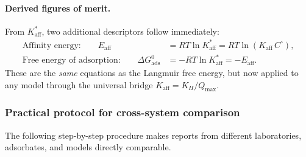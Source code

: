 \documentclass[12pt]{article}
\begin{document}
	\paragraph{Derived figures of merit.}
	From $K_{\mathrm{aff}}^{\ast}$, two additional descriptors follow
	immediately:
	\begin{align}
		\text{Affinity energy:}\qquad
		E_{\mathrm{aff}}
		&= RT\ln K_{\mathrm{aff}}^{\ast}
		= RT\ln(K_{\mathrm{aff}}\, C^\circ),
		\label{eq:Eaff_universal}
		\\[4pt]
		\text{Free energy of adsorption:}\qquad
		\Delta G_{\mathrm{ads}}^{0}
		&= -RT\ln K_{\mathrm{aff}}^{\ast}
		= -E_{\mathrm{aff}}.
		\label{eq:DG_universal}
	\end{align}
	These are the \emph{same} equations as the Langmuir free energy, but
	now applied to any model through the universal bridge
	$K_{\mathrm{aff}} = K_H / Q_{\max}$.

	\subsubsection{Practical protocol for cross-system comparison}

	The following step-by-step procedure makes reports from different
	laboratories, adsorbates, and models directly comparable.
\end{document}

